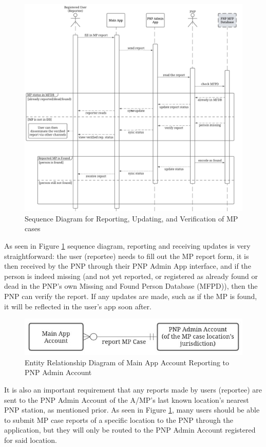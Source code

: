 \begin{figure}[!h]
    \centering
    \includegraphics{figures/Chapter3/Chapt3_seqDiag_report.jpeg}
    \caption{Sequence Diagram for Reporting, Updating, and Verification of MP cases}
    \label{fig:seqDiaReport}
\end{figure}
As seen in Figure \ref{fig:seqDiaReport} sequence diagram, reporting and receiving updates is very straightforward: the user (reportee) needs to fill out the MP report form, it is then received by the PNP through their PNP Admin App interface, and if the person is indeed missing (and not yet reported, or registered as already found or dead in the PNP's own Missing and Found Person Database (MFPD)), then the PNP can verify the report. If any updates are made, such as if the MP is found, it will be reflected in the user’s app soon after.

\begin{figure}[!h]
    \centering
    \includegraphics[width=\textwidth]{figures/Chapter3/Chapt3_ERDiag_reporteePNP.jpeg}
    \caption{Entity Relationship Diagram of Main App Account Reporting to PNP Admin Account}
    \label{fig:ERDReportee}
\end{figure}
It is also an important requirement that any reports made by users (reportee) are sent to the PNP Admin Account of the A/MP's last known location’s nearest PNP station, as mentioned prior. As seen in Figure \ref{fig:seqDiaReport}, many users should be able to submit MP case reports of a specific location to the PNP through the application, but they will only be routed to the PNP Admin Account registered for said location.

